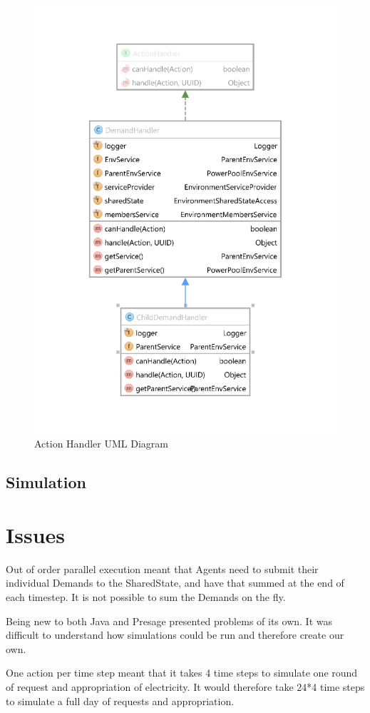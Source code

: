 \begin{figure}[!h]
	\centering
	\includegraphics[scale=0.4]{Images/ActionHandlerUML.png}
	\caption{Action Handler UML Diagram}
	\label{fig:ActionHandlerUML}
\end{figure}

\subsection*{Simulation}


\section*{Issues}
Out of order parallel execution meant that Agents need to submit their individual Demands to the SharedState, and have that summed at the end of each timestep. It is not possible to sum the Demands on the fly.

Being new to both Java and Presage presented problems of its own. It was difficult to understand how simulations could be run and therefore create our own.

One action per time step meant that it takes 4 time steps to simulate one round of request and appropriation of electricity. It would therefore take 24*4 time steps to simulate a full day of requests and appropriation.
